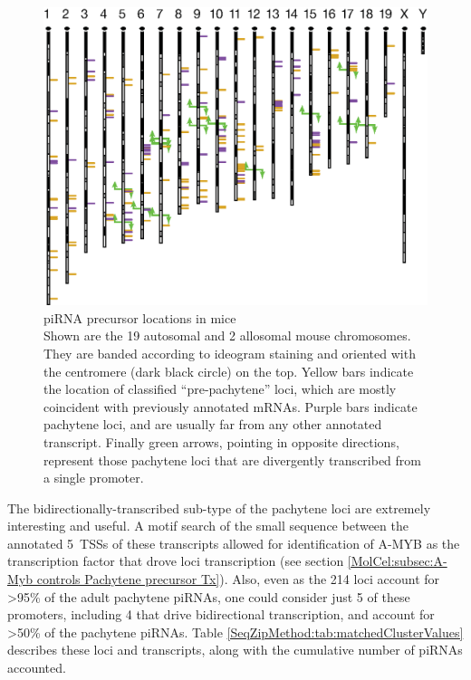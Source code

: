     \begin{figure} %
      \centering 
      \includegraphics{Figures/SeqZipMethod/PrecursorLocations.eps}
      \caption[Pachytene piRNA precursor locations in mice]
      {
        piRNA precursor locations in mice\\[0.25cm]
        Shown are the 19 autosomal and 2 allosomal mouse chromosomes. They are banded according to ideogram staining and oriented with the centromere (dark black circle) on the top. Yellow bars indicate the location of classified ``pre-pachytene'' loci, which are mostly coincident with previously annotated mRNAs. Purple bars indicate pachytene loci, and are usually far from any other annotated transcript. Finally green arrows, pointing in opposite directions, represent those pachytene loci that are divergently transcribed from a single promoter.
     	 }
      \label{SeqZipMethod:fig:precursor Loci Locations}
      \end{figure}

    The bidirectionally-transcribed sub-type of the pachytene loci are extremely interesting and useful. A motif search of the small sequence between the annotated 5\textprime~TSSs of these transcripts allowed for identification of A-MYB as the transcription factor that drove loci transcription (see section \ref{MolCel:subsec:A-Myb controls Pachytene precursor Tx}). Also, even as the 214 loci account for >95\% of the adult pachytene piRNAs, one could consider just 5 of these promoters, including 4 that drive bidirectional transcription, and account for >50\% of the pachytene piRNAs. Table \ref{SeqZipMethod:tab:matchedClusterValues} describes these loci and transcripts, along with the cumulative number of piRNAs accounted.

